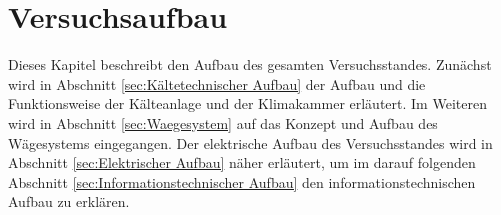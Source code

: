 \chapter{Versuchsaufbau}
\label{cha: Versuchsaufbau}

Dieses Kapitel beschreibt den Aufbau des gesamten Versuchsstandes. Zunächst wird in Abschnitt \ref{sec:Kältetechnischer Aufbau} der Aufbau und die Funktionsweise der Kälteanlage und der Klimakammer erläutert. Im Weiteren wird in Abschnitt \ref{sec:Waegesystem} auf das Konzept und Aufbau des Wägesystems eingegangen. 
Der elektrische Aufbau des Versuchsstandes wird in Abschnitt \ref{sec:Elektrischer Aufbau} näher erläutert, um im darauf folgenden Abschnitt \ref{sec:Informationstechnischer Aufbau} den informationstechnischen Aufbau zu erklären. 









\newpage

